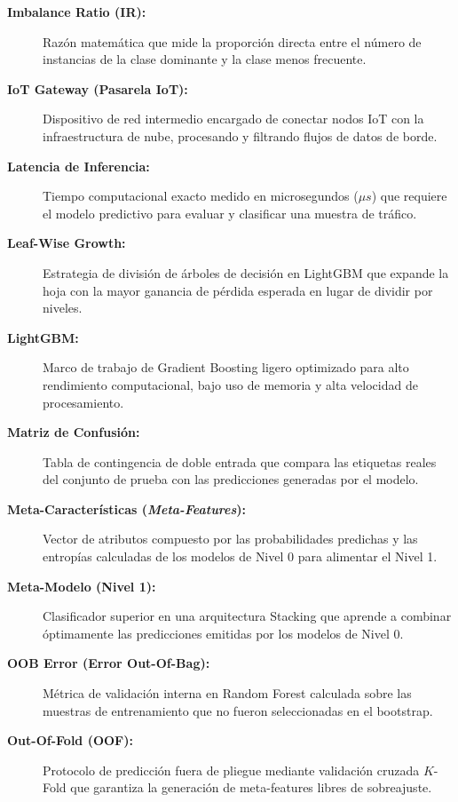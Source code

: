 \begin{description}
    \item[\textbf{Imbalance Ratio (IR):}] Razón matemática que mide la proporción directa entre el número de instancias de la clase dominante y la clase menos frecuente.

    \item[\textbf{IoT Gateway (Pasarela IoT):}] Dispositivo de red intermedio encargado de conectar nodos IoT con la infraestructura de nube, procesando y filtrando flujos de datos de borde.

    \item[\textbf{Latencia de Inferencia:}] Tiempo computacional exacto medido en microsegundos ($\mu s$) que requiere el modelo predictivo para evaluar y clasificar una muestra de tráfico.

    \item[\textbf{Leaf-Wise Growth:}] Estrategia de división de árboles de decisión en LightGBM que expande la hoja con la mayor ganancia de pérdida esperada en lugar de dividir por niveles.

    \item[\textbf{LightGBM:}] Marco de trabajo de Gradient Boosting ligero optimizado para alto rendimiento computacional, bajo uso de memoria y alta velocidad de procesamiento.

    \item[\textbf{Matriz de Confusión:}] Tabla de contingencia de doble entrada que compara las etiquetas reales del conjunto de prueba con las predicciones generadas por el modelo.

    \item[\textbf{Meta-Características (\textit{Meta-Features}):}] Vector de atributos compuesto por las probabilidades predichas y las entropías calculadas de los modelos de Nivel 0 para alimentar el Nivel 1.

    \item[\textbf{Meta-Modelo (Nivel 1):}] Clasificador superior en una arquitectura Stacking que aprende a combinar óptimamente las predicciones emitidas por los modelos de Nivel 0.

    \item[\textbf{OOB Error (Error Out-Of-Bag):}] Métrica de validación interna en Random Forest calculada sobre las muestras de entrenamiento que no fueron seleccionadas en el bootstrap.

    \item[\textbf{Out-Of-Fold (OOF):}] Protocolo de predicción fuera de pliegue mediante validación cruzada $K$-Fold que garantiza la generación de meta-features libres de sobreajuste.


\end{description}
